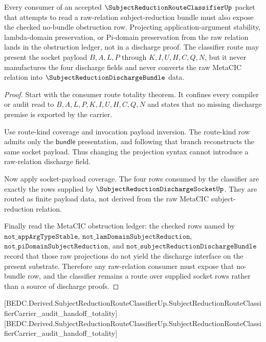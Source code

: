 \begin{theorem}
\label{thm:subject-reduction-route-classifier-obstruction-projection-boundary}
Every consumer of an accepted $\SubjectReductionRouteClassifierUp$ packet that attempts to read a raw-relation subject-reduction bundle must also expose the checked no-bundle obstruction row. Projecting application-argument stability, lambda-domain preservation, or Pi-domain preservation from the raw relation lands in the obstruction ledger, not in a discharge proof. The classifier route may present the socket payload $B,A,L,P$ through $K,I,U,H,C,Q,N$, but it never manufactures the four discharge fields and never converts the raw MetaCIC relation into $\SubjectReductionDischargeBundle$ data.
\end{theorem}
\begin{proof}
Start with the consumer route totality theorem. It confines every compiler or audit read to $B,A,L,P,K,I,U,H,C,Q,N$ and states that no missing discharge premise is exported by the carrier.

Use route-kind coverage and invocation payload inversion. The route-kind row admits only the $\mathsf{bundle}$ presentation, and following that branch reconstructs the same socket payload. Thus changing the projection syntax cannot introduce a raw-relation discharge field.

Now apply socket-payload coverage. The four rows consumed by the classifier are exactly the rows supplied by $\SubjectReductionDischargeSocketUp$. They are routed as finite payload data, not derived from the raw MetaCIC subject-reduction relation.

Finally read the MetaCIC obstruction ledger: the checked rows named by $\texttt{not\_appArgTypeStable}$, $\texttt{not\_lamDomainSubjectReduction}$, $\texttt{not\_piDomainSubjectReduction}$, and $\texttt{not\_subjectReductionDischargeBundle}$ record that those raw projections do not yield the discharge interface on the present substrate. Therefore any raw-relation consumer must expose that no-bundle row, and the classifier remains a route over supplied socket rows rather than a source of discharge proofs.
\end{proof}

[BEDC.Derived.SubjectReductionRouteClassifierUp.SubjectReductionRouteClassifierCarrier\_audit\_handoff\_totality]
[BEDC.Derived.SubjectReductionRouteClassifierUp.SubjectReductionRouteClassifierCarrier\_audit\_handoff\_totality]

